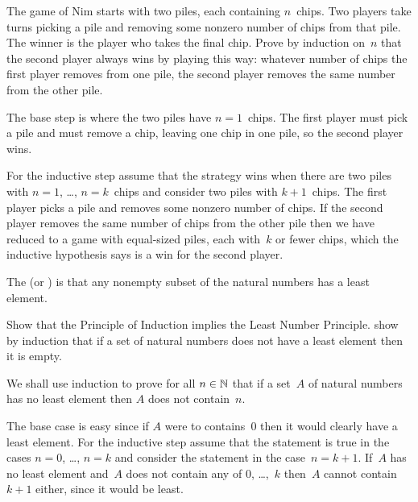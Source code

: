 \documentclass{ibl}  %
\begin{document}
\begin{problem}
The game of Nim starts with two piles, each containing $n$~chips.
Two players take turns picking a pile and removing 
some nonzero number of chips from that pile. 
The winner is the player who takes the final chip.
Prove by induction on~$n$ that the second player always wins by
playing this way: whatever number of chips the first player removes
from one pile, the second player removes the same number from the other pile.
\begin{answer}
The base step is where the two piles have $n=1$~chips.
The first player must pick a pile and must remove a chip, leaving one chip
in one pile, so the second player wins.

For the inductive step assume that the strategy wins when there are two piles
with $n=1$, \ldots, $n=k$~chips and consider two piles with
$k+1$~chips.
The first player picks a pile and removes some nonzero number of chips.
If the second player removes the same number of chips from the other
pile then we have reduced to a game with equal-sized piles, each
with~$k$ or fewer chips, which the inductive hypothesis says
is a win for the second player.  
\end{answer}
\end{problem}

\begin{df}
The  
(or )
is that any nonempty 
subset of the natural
numbers has a least element.  
\end{df}

\begin{problem}
Show that the Principle of Induction implies the Least Number 
Principle.
\hint
show by induction that if a set of natural numbers does not
have a least element then it is empty.
\begin{answer}
We shall use induction to prove for all $n\in\mathbb{N}$ that if a set~$A$ 
of natural numbers has no
least element then $A$ does not contain~$n$.

The base case is easy since if $A$ were to contains~$0$ then it would
clearly have a least element.
For the inductive step assume that the statement is true in the cases
$n=0$, \ldots, $n=k$ and consider the statement in the case~$n=k+1$.
If~$A$ has no least element and~$A$ does not contain any of $0$, \ldots,~$k$ 
then~$A$ cannot contain~$k+1$ either, since it would be least.   
\end{answer}
\end{problem}
\end{document}
